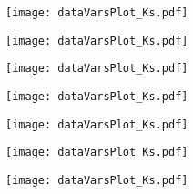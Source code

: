 \begin{figure}[H]
\begin{subfigure}{0.5\linewidth}
\texttt{[image: dataVarsPlot\_Ks.pdf]}
\end{subfigure}
\begin{subfigure}{0.5\linewidth}
\texttt{[image: dataVarsPlot\_Ks.pdf]}
\end{subfigure}
\begin{subfigure}{0.5\linewidth}
\texttt{[image: dataVarsPlot\_Ks.pdf]}
\end{subfigure}
\begin{subfigure}{0.5\linewidth}
\texttt{[image: dataVarsPlot\_Ks.pdf]}
\end{subfigure}
\begin{subfigure}{0.5\linewidth}
\texttt{[image: dataVarsPlot\_Ks.pdf]}
\end{subfigure}
\begin{subfigure}{0.5\linewidth}
\texttt{[image: dataVarsPlot\_Ks.pdf]}
\end{subfigure}
\begin{subfigure}{0.5\linewidth}
\texttt{[image: dataVarsPlot\_Ks.pdf]}
\end{subfigure}
\end{figure}



